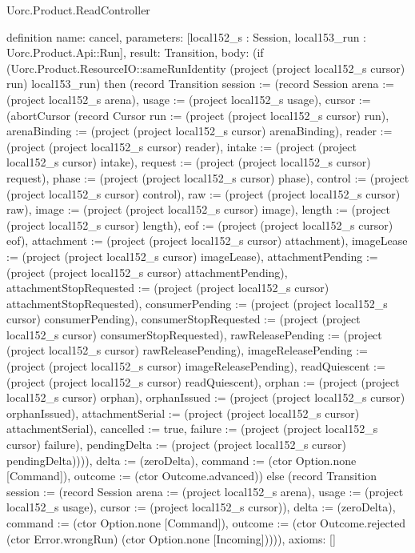 \begin{lexlean}{Uorc.Product.ReadController}
\begin{semanticmodule}
definition{
  name: cancel,
  parameters: [local152_s : Session, local153_run : Uorc.Product.Api::Run],
  result: Transition,
  body: (if (Uorc.Product.ResourceIO::sameRunIdentity (project (project local152_s cursor) run) local153_run) then (record Transition {session := (record Session {arena := (project local152_s arena), usage := (project local152_s usage), cursor := (abortCursor (record Cursor {run := (project (project local152_s cursor) run), arenaBinding := (project (project local152_s cursor) arenaBinding), reader := (project (project local152_s cursor) reader), intake := (project (project local152_s cursor) intake), request := (project (project local152_s cursor) request), phase := (project (project local152_s cursor) phase), control := (project (project local152_s cursor) control), raw := (project (project local152_s cursor) raw), image := (project (project local152_s cursor) image), length := (project (project local152_s cursor) length), eof := (project (project local152_s cursor) eof), attachment := (project (project local152_s cursor) attachment), imageLease := (project (project local152_s cursor) imageLease), attachmentPending := (project (project local152_s cursor) attachmentPending), attachmentStopRequested := (project (project local152_s cursor) attachmentStopRequested), consumerPending := (project (project local152_s cursor) consumerPending), consumerStopRequested := (project (project local152_s cursor) consumerStopRequested), rawReleasePending := (project (project local152_s cursor) rawReleasePending), imageReleasePending := (project (project local152_s cursor) imageReleasePending), readQuiescent := (project (project local152_s cursor) readQuiescent), orphan := (project (project local152_s cursor) orphan), orphanIssued := (project (project local152_s cursor) orphanIssued), attachmentSerial := (project (project local152_s cursor) attachmentSerial), cancelled := true, failure := (project (project local152_s cursor) failure), pendingDelta := (project (project local152_s cursor) pendingDelta)}))}), delta := (zeroDelta), command := (ctor Option.none [Command]), outcome := (ctor Outcome.advanced)}) else (record Transition {session := (record Session {arena := (project local152_s arena), usage := (project local152_s usage), cursor := (project local152_s cursor)}), delta := (zeroDelta), command := (ctor Option.none [Command]), outcome := (ctor Outcome.rejected (ctor Error.wrongRun) (ctor Option.none [Incoming]))})),
  axioms: []
}


\end{semanticmodule}
\end{lexlean}
